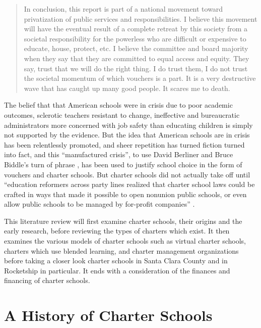 \begin{quote}\OnehalfSpacing%
In conclusion, this report is part of a national movement toward privatization of public services and responsibilities.
I believe this movement will have the eventual result of a complete retreat by this society from a societal responsibility for the powerless who are difficult or expensive to educate, house, protect, etc. I believe the committee and board majority when they say that they are committed to equal access and equity. They say, trust that we will do the right thing. I do trust them, I do not trust the societal momentum of which vouchers is a part. It is a very destructive wave that has caught up many good people. It scares me to death.\\
\end{quote}

The belief that that American schools were in crisis due to poor academic outcomes, sclerotic teachers resistant to change, ineffective and bureaucratic administrators more concerned with job safety than educating children is simply not supported by the evidence. But the idea that American schools are in crisis has been relentlessly promoted, and sheer repetition has turned fiction turned into fact, and this ``manufactured crisis'', to use David Berliner and Bruce Biddle's turn of phrase \parencite{Berliner.Biddle1997}, has been used to justify school choice in the form of vouchers and charter schools. But charter schools did not actually take off until ``education reformers across party lines realized that charter school laws could be crafted in ways that made it possible to open nonunion public schools, or even allow public schools to be managed by for-profit companies'' \parencite[172]{Goldstein2015a}.

This literature review will first examine charter schools, their origins and the early research, before reviewing the types of charters which exist. It then examines the various models of charter schools such as virtual charter schools, charters which use blended learning, and charter management organizations before taking a closer look charter schools in Santa Clara County and in Rocketship in particular. It ends with a consideration of the finances and financing of charter schools.

\section{A History of Charter Schools}\label{sec:cs-history}\indent

